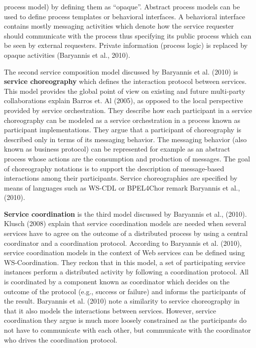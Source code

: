 \documentclass{article}
\begin{document}
process model) by defining them as “opaque”. Abstract process models can be used to define process templates or behavioral interfaces. A behavioral interface contains mostly messaging activities which denote how the service requester should communicate with the process thus specifying its public process which can be seen by external requesters. Private information (process logic) is replaced by opaque activities (Baryannis et al., 2010). 

The second service composition model discussed by Baryannis et al. (2010) is \textbf{service choreography} which defines the interaction protocol between services. This model provides the global point of view on existing and future multi-party collaborations explain Barros et. Al (2005), as opposed to the local perspective provided by service orchestration. They describe how each participant in a service choreography can be modeled as a service orchestration in a process known as participant implementations. They argue that a participant of choreography is described only in terms of its messaging behavior. The messaging behavior (also known as business protocol) can be represented for example as an abstract process whose actions are the consumption and production of messages. The goal of choreography notations is to support the description of message-based interactions among their participants. Service choreographies are specified by means of languages such as WS-CDL or BPEL4Chor remark Baryannis et al., (2010). 

\textbf{Service coordination} is the third model discussed by Baryannis et al., (2010). Klusch (2008) explain that service coordination models are needed when several services have to agree on the outcome of a distributed process by using a central coordinator and a coordination protocol. According to Baryannis et al. (2010), service coordination models in the context of Web services can be defined using WS-Coordination. They reckon that in this model, a set of participating service instances perform a distributed activity by following a coordination protocol. All is coordinated by a component known as coordinator which decides on the outcome of the protocol (e.g., success or failure) and informs the participants of the result. Baryannis et al. (2010) note a similarity to service choreography in that it also models the interactions between services. However, service coordination they argue is much more loosely constrained as the participants do not have to communicate with each other, but communicate with the coordinator who drives the coordination protocol. 
\end{document}

